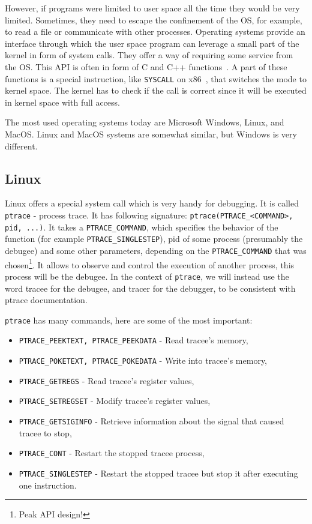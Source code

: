 However, if programs were limited to user space all the time they would be very
limited. Sometimes, they need to escape the confinement of the OS, for example,
to read a file or communicate with other processes. Operating systems provide
an interface through which the user space program can leverage a small part of
the kernel in form of system calls. They offer a way of requiring some service
from the OS. This API is often in form of C and C++
functions~\cite{os-concepts}. A part of these functions is a special
instruction, like \texttt{SYSCALL} on x86~\cite{intel-manual}, that switches
the mode to kernel space. The kernel has to check if the call is correct since
it will be executed in kernel space with full access.

The most used operating systems today are Microsoft Windows, Linux, and MacOS.
Linux and MacOS systems are somewhat similar, but Windows is very different.

\subsection{Linux}
Linux offers a special system call which is very handy for debugging. It is
called \texttt{ptrace} \cite{ptrace} - process trace. It has following
signature: \texttt{ptrace(PTRACE\_<COMMAND>, pid, ...)}. It takes a
\texttt{PTRACE\_COMMAND}, which specifies the behavior of the function (for
example \texttt{PTRACE\_SINGLESTEP}), pid of some process (presumably the
debugee) and some other parameters, depending on the \texttt{PTRACE\_COMMAND}
that was chosen\footnote{Peak API design!}. It allows to observe and control
the execution of another process, this process will be the debugee. In the
context of \texttt{ptrace}, we will instead use the word tracee for the
debugee, and tracer for the debugger, to be consistent with ptrace
documentation.

\texttt{ptrace} has many commands, here are some of the most important:
\begin{itemize}
    \item \texttt{PTRACE\_PEEKTEXT, PTRACE\_PEEKDATA} - Read tracee's memory,
    \item \texttt{PTRACE\_POKETEXT, PTRACE\_POKEDATA} - Write into tracee's
          memory,
    \item \texttt{PTRACE\_GETREGS} - Read tracee's register values,
    \item \texttt{PTRACE\_SETREGSET} - Modify tracee's register values,
    \item \texttt{PTRACE\_GETSIGINFO} - Retrieve information about the signal
                                        that caused tracee to stop,
    \item \texttt{PTRACE\_CONT} - Restart the stopped tracee process,
    \item \texttt{PTRACE\_SINGLESTEP} - Restart the stopped tracee but
          stop it after executing one instruction.
\end{itemize}

